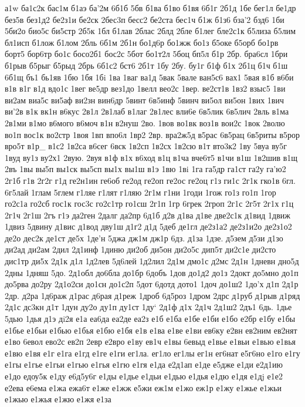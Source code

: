{{а1w
ба1с2к
бас1м
б1аэ
ба'2м
6б1б
5бв
б1ва
б1во
б1вя
6б1г
2б1д
1бе
бег1л
бе1др
без5в
без1д2
бе2з1и
бе2ск
2бес3п
бесс2
бе2ста
бес1ч
б1ж
б1з6
бза'2
бзд6
1би
5би2о
био5с
би5стр
2б5к
1бл
б1лав
2блас
2блд
2бле
б1лег
бле2с1к
б5лиза
б5лим
бл1исп
б1лож
б1лом
2бль
6б1м
2б1н
бо1д6р
бо1жж
бо1з
б5оке
б5орб
бо1рв
борт5
бор6тр
бо1с
босо2б1
бос2с
5бот
бо1т2л
5боц
бп5л
б1р
2бр.
бра6сл
1бри
б1рыв
б5рыг
б5рыд
2брь
6б1с2
бст6
2б1т
1бу
2бу.
бу1г
б1ф
б1х
2б1ц
б1ч
б1ш
6б1щ
бъ1
бь1яв
1бю
1бя
1бi
1ва
1ваг
ва1д
5вак
5вале
ван5с6
вах1
5вая
в1б
в6би
в1в
в1г
в1д
вдо1с
1вег
ве5др
вез1до
1велл
вео2с
1вер.
ве2ст1в
1вз2
взыс5
1ви
ви2ам
виа5с
ви5аф
ви2зн
вин6др
5винт
6в5инф
5винч
ви5ол
ви5он
1вих
1вич
ви'2в
в1к
вк1н
в6кус
2в1л
2в1лаб
в1лаг
2в1лес
вли6е
6в5лик
6в5лич
2вль
в1ма
2в1ми
в1мо
в6мого
в6моч
в1н
в2нуш
2во.
1вов
во1вк
воз1в
вои2с
1вок
2волю
во1п
вос1к
во2стр
1воя
1вп
впо6л
1вр2
2вр.
вра2ж5д
в5рас
6в5рац
6в5риты
в5рор
вро5т
в1р_
в1с2
1в2са
в6сег
6вск
1в2сп
1в2сх
1в2сю
в1т
вто3к2
1ву
5вуа
ву5г
1вуд
ву1з
ву2х1
2вую.
2вуя
в1ф
в1х
в6ход
в1ц
в1ча
вче6т5
в1чи
в1ш
1в2шив
в1щ
2въ
1вы
вы5п
вы1ск
вы5сп
вы1х
вы1ш
в1э
1вю
1вi
1га
га5др
га1ст
га2у
га'ю2
2г1б
г1в
2г2г
г1д
ге2н1ин
ге6об
ге2од
ге2оп
ге2ос
ге2оц
г1з
ги1с
2г1к
гко1в
6гл.
6г5лай
1глам
5глем
г1ляе
г1лят
г1ляю
2г1м
г1ни
1годи
1гож
го1з
го1п
1гор
го2с1а
го2сб
гос1к
гос3с
го2с1тр
го1сш
2г1п
1гр
6грек
2гроп
2г1с
2г5т
2г1х
г1ц
2г1ч
2г1ш
2гъ
г1э
да2ген
2далг
да2пр
6д1б
д2в
д1ва
д1ве
две2с1к
д1вид
1движ
1двиз
5двину
д1вис
д1вод
дву1ш
д1г2
д1д
5деб
де1гл
де2з1а2
де2з1и2о
де2з1о2
де2о
дес2к
де1ст
де5х
1де'н
5джа
дж1м
дж1р
6дз.
д1за
1дзе.
д5зем
д5зи
д1зо
ди2ад
ди2ам
2дил
2д1инф
1диню
ди2об
ди5он
ди2о5с
дип5т
ди2с1е
ди2сто
дис1тр
ди5х
2д1к
д1л
1д2лев
5д6лей
1д2лил
2д1м
дмо1с
д2мс
2д1н
1дневн
дно5д
2дны
1дняш
5до.
2д1обл
до6бла
до1бр
6добъ
1дов
до1д2
до1з
2докт
до5мно
до1п
до5рва
до2ру
2д1о2си
до1сн
до1с2п
5дот
6дотд
дото1
1доч
до1ш2
1до'х
д1п
2д1р
2др.
д2ра
1д6раж
д1рас
д6рая
д1реж
1дроб
6д5роз
1дром
2дрс
д1руб
д1рыв
д1ряд
2д1с
дс3кн
д1т
1дун
ду2о
ду1п
ду1ст
1ду`
2д1ф
д1х
2д1ч
2д1ш2
2дъ1
6дь.
1дье
5дью
1дья
д1э
дi2я
е1а
еа6да
еа2де
еа2з
е1б
е1ба
е1бе
е1би
е1бо
е2бр
е1бу
е1бы
е1бье
е1бьи
е1бью
е1бья
е1бю
е1бя
е1в
е1ва
е1ве
е1ви
ев6ку
е2вн
ев2ним
ев2нят
е1во
6евол
ево2с
ев2п
2евр
е2вро
е1ву
ев1ч
е1вы
6евыд
е1вье
е1вьи
е1вью
е1вья
е1вю
е1вя
е1г
е1га
е1гд
е1ге
е1ги
ег1ла.
ег1ло
ег1лы
ег1н
ег6нат
е5г6но
е1го
е1гу
е1гы
е1гье
е1гьи
е1гью
е1гья
е1гю
е1гя
е1да
е2д1ап
е1де
е5дже
е1ди
е2д1ию
е1до
едоу5к
е1ду
е6д5у6г
е1ды
е1дье
е1дьи
е1дью
е1дья
е1дю
е1дя
е1дj
е1е2
е2ева
е6ема
е1жа
ежа6т
е1же
е1жж
е5жи
еж1м
е1жо
еж1р
е1жу
е1жье
е1жьи
е1жью
е1жья
е1жю
е1жя
е1за
}}
